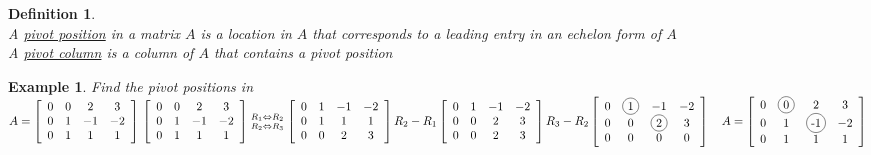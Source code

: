 \documentclass[a4paper,12pt,openany]{book}
\newcommand*{\bfrac}[2]{\genfrac{}{}{0pt}{}{#1}{#2}}
\newcommand*\circled[1]{\tikz[baseline=(char.base)]{
            \node[shape=circle,draw,inner sep=2pt] (char) {#1};}}
\theoremstyle{defn}
\newtheorem{defn}{Definition}[section]
\theoremstyle{expl}
\newtheorem{expl}{Example}[section]
\begin{document}
\begin{defn}\textup{\-\\
	A \underline{pivot position} in a matrix $A$ is a location in $A$ that corresponds to a leading entry in an echelon form of $A$\\
	A \underline{pivot column} is a column of $A$ that contains a pivot position  
}\end{defn}
\begin{expl}\textup{
Find the pivot positions in $A = \left[\begin{array}{cccc}0&0&2&3\\0&1&-1&-2\\0&1&1&1\end{array}\right]\\
\left[\begin{array}{cccc}0&0&2&3\\0&1&-1&-2\\0&1&1&1\end{array}\right] \bfrac{R_1\Leftrightarrow R_2}{R_2\Leftrightarrow R_3}\left[\begin{array}{cccc}0&1&-1&-2\\0&1&1&1\\0&0&2&3\end{array}\right]R_2-R_1\left[\begin{array}{cccc}0&1&-1&-2\\0&0&2&3\\0&0&2&3\end{array}\right]\\R_3-R_2\left[\begin{array}{cccc}0&\circled{1}&-1&-2\\0&0&\circled{2}&3\\0&0&0&0\end{array}\right]\quad A = \left[\begin{array}{cccc}0&\circled{0}&2&3\\0&1&\circled{-1}&-2\\0&1&1&1\end{array}\right]
$}\end{expl}
\end{document}
